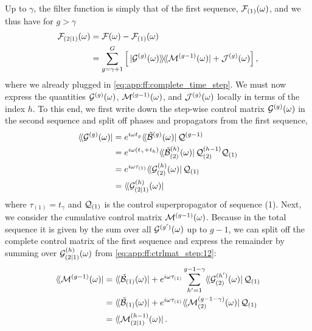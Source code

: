 Up to $\gamma$, the filter function is simply that of the first sequence, $\mathcal{F}_{(1)}(\omega)$, and we thus have for $g>\gamma$
\begin{align}
    \FF_{(2|1)}(\omega) &= \FF(\omega) - \FF_{(1)}(\omega) \notag \\
                        &= \sum_{g=\gamma+1}^{G}\left[
                            \dop*{\mc{G}\gth{g}(\omega)}{\mc{M}\gth{g-1}(\omega)} + \mc{J}\gth{g}(\omega)
                        \right],\label{eq:app:ff:filter_function:12:2}
\end{align}
where we already plugged in \cref{eq:app:ff:complete_time_step}.
We must now express the quantities $\mathcal{G}^{(g)}(\omega)$, $\mathcal{M}^{(g-1)}(\omega)$, and $\mathcal{J}^{(g)}(\omega)$ locally in terms of the index $h$.
To this end, we first write down the step-wise control matrix $\mathcal{G}^{(g)}(\omega)$ in the second sequence and split off phases and propagators from the first sequence,
\begin{align}\label{eq:app:ff:ctrlmat_step:12}
    \dbra*{\mc{G}\gth{g}(\omega)} &= \e^{\i\omega t_{g}}\dbra*{\ctrlmat\gth{g}(\omega)}\liouvQ\gth{g-1} \notag \\
                                  &= \e^{\i\omega (t_\gamma + t_{h})}\dbra*{\ctrlmat_{(2)}\gth{h}(\omega)}\liouvQ_{(2)}\gth{h-1}\liouvQ_{(1)} \notag \\
                                  &= \e^{\i\omega\tau_{(1)}}\dbra*{\mc{G}_{(2)}\gth{h}(\omega)}\liouvQ_{(1)} \notag \\
                                  &= \dbra*{\mc{G}_{(2|1)}\gth{h}(\omega)}
\end{align}
where $\tau_{(1)}=t_{\gamma}$ and $\mathcal{Q}_{(1)}$ is the control superpropagator of sequence (1).
Next, we consider the cumulative control matrix $\mathcal{M}^{(g-1)}(\omega)$.
Because in the total sequence it is given by the sum over all $\mathcal{G}^{(g^{\prime})}(\omega)$ up to $g-1$, we can split off the complete control matrix of the first sequence and express the remainder by summing over $\mathcal{G}^{(h)}_{(2|1)}(\omega)$ from \cref{eq:app:ff:ctrlmat_step:12}:
\begin{align}
    \dbra*{\mc{M}\gth{g-1}(\omega)} &= \dbra*{\ctrlmat_{(1)}(\omega)} + \e^{\i\omega\tau_{(1)}}\sum_{h^{\prime}=1}^{g-1-\gamma}
                                        \dbra*{\mc{G}_{(2)}\gth{h^{\prime}}(\omega)}\liouvQ_{(1)} \notag \\
                                    &= \dbra*{\ctrlmat_{(1)}(\omega)} + \e^{\i\omega\tau_{(1)}}\dbra*{\mc{M}_{(2)}\gth{g-1-\gamma}(\omega)}\liouvQ_{(1)} \notag \\
                                    &= \dbra*{\mc{M}_{(2|1)}\gth{h-1}(\omega)}. \label{eq:app:ff:ctrlmat_cumulative:12:2}
\end{align}
